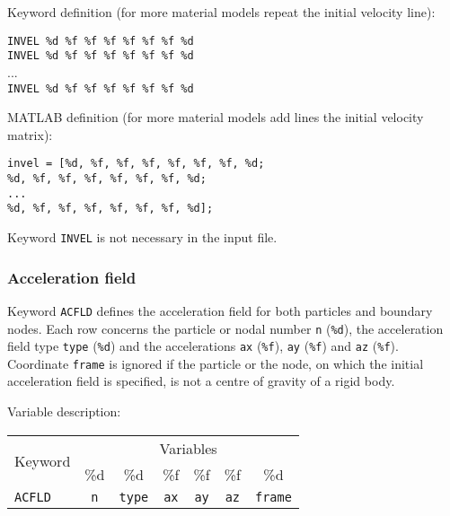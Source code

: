 Keyword definition (for more material models repeat the initial velocity line):

\begin{tcolorbox}
\texttt{INVEL \%d \%f \%f \%f \%f \%f \%f \%d} \\
\texttt{INVEL \%d \%f \%f \%f \%f \%f \%f \%d} \\
... \\
\texttt{INVEL \%d \%f \%f \%f \%f \%f \%f \%d}
\end{tcolorbox}

MATLAB definition (for more material models add lines the initial velocity matrix):

\begin{tcolorbox}
\texttt{invel = [\%d, \%f, \%f, \%f, \%f, \%f, \%f, \%d; \\
\%d, \%f, \%f, \%f, \%f, \%f, \%f, \%d; \\
... \\
\%d, \%f, \%f, \%f, \%f, \%f, \%f, \%d];}
\end{tcolorbox}

Keyword \texttt{INVEL} is not necessary in the input file.

\newpage


\subsubsection{Acceleration field}

Keyword \texttt{ACFLD} defines the acceleration field for both particles and boundary nodes. Each row concerns the particle or nodal number \texttt{n} (\texttt{\%d}), the acceleration field type \texttt{type} (\texttt{\%d}) and the accelerations \texttt{ax} (\texttt{\%f}), \texttt{ay} (\texttt{\%f}) and \texttt{az} (\texttt{\%f}). Coordinate \texttt{frame} is ignored if the particle or the node, on which the initial acceleration field is specified, is not a centre of gravity of a rigid body.

Variable description:

\begin{tabular}{|l|c|c|c|c|c|c|}
\hline
\multirow{2}{*}{Keyword} & \multicolumn{6}{c|}{Variables} \\ \cline{2-7}
& \%d & \%d & \%f & \%f & \%f & \%d \\ \hline
\texttt{ACFLD} & \texttt{n} & \texttt{type} & \texttt{ax} & \texttt{ay} & \texttt{az} & \texttt{frame} \\ \hline
\end{tabular}


